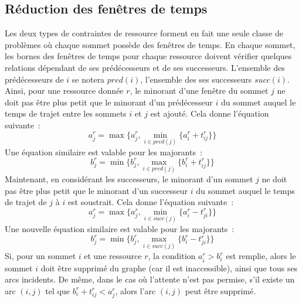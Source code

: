 \documentclass[10pt,francais]{llncs}
\begin{document}
\subsection{R\'eduction des fen\^etres de temps}\label{sub-reduc-reduc}
Les deux types de contraintes de ressource forment en fait une seule classe de probl\`emes o\`u chaque sommet poss\`ede des fen\^etres de temps. En chaque sommet, les bornes des fen\^etres de temps pour chaque ressource doivent v\'erifier quelques relations d\'ependant de ses pr\'ed\'ecesseurs et de ses successeurs. L'ensemble des pr\'ed\'ecesseurs de $i$ se notera $pred(i)$, l'ensemble des ses successeurs $succ(i)$. Ainsi, pour une ressource donn\'ee $r$, le minorant d'une fen\^etre du sommet $j$ ne doit pas \^etre plus petit que le minorant d'un pr\'ed\'ecesseur $i$ du sommet auquel le temps de trajet entre les sommets $i$ et $j$ est ajout\'e. Cela donne l'\'equation suivante~:
$$
a^r_j = \max \{ a^r_j, \min_{i \in pred(j)} \{ a^r_i + t^r_{ij}\} \}
$$
Une \'equation similaire est valable pour les majorants~:
$$
b^r_j = \min \{ b^r_j, \max_{i \in pred(j)} \{ b^r_i + t^r_{ij}\} \}
$$
Maintenant, en consid\'erant les successeurs, le minorant d'un sommet $j$ ne doit pas \^etre plus petit que le minorant d'un successeur $i$ du sommet auquel le temps de trajet de $j$ \`a $i$ est soustrait. Cela donne l'\'equation suivante~:
$$
a^r_j = \max \{ a^r_j, \min_{i \in succ(j)} \{ a^r_i - t^r_{ji}\} \}
$$
Une nouvelle \'equation similaire est valable pour les majorants~:
$$
b^r_j = \min \{ b^r_j, \max_{i \in succ(j)} \{ b^r_i - t^r_{ji}\} \}
$$
Si, pour un sommet $i$ et une ressource $r$, la condition $a^r_i > b^r_i$ est remplie, alors le sommet $i$ doit \^etre supprim\'e du graphe (car il est inaccessible), ainsi que tous ses arcs incidents. De m\^eme, dans le cas o\`u l'attente n'est pas permise, s'il existe un arc $(i,j)$ tel que $b^r_i + t^r_{ij} < a^r_j$, alors l'arc $(i,j)$ peut \^etre supprim\'e.\\
\end{document}
